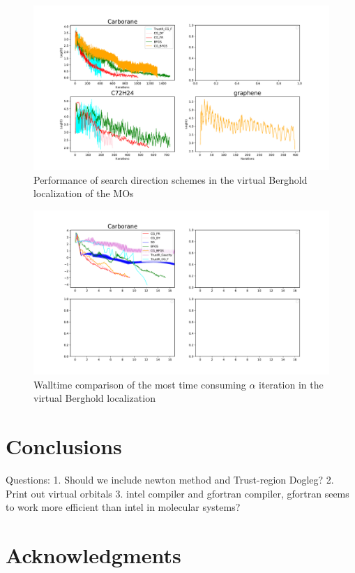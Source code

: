 \documentclass[aps,prl,reprint,amsmath,amssymb]{revtex4-1}
\begin{document}
\begin{figure}[htb]
\centering
\includegraphics[width=\textwidth]{virtual_grad.pdf}
\caption{Performance of search direction schemes in the virtual Berghold localization of the MOs}
\label{fig:vir_grad}
\end{figure}


\begin{figure}[htb]
\centering
\includegraphics[width=\textwidth]{virtual_walltime.pdf}
\caption{Walltime comparison of the most time consuming $\alpha$ iteration in the virtual Berghold localization}
\label{fig:vir_walltime}
\end{figure}


\section{Conclusions}

Questions:
1. Should we include newton method and Trust-region Dogleg?
2. Print out virtual orbitals
3. intel compiler and gfortran compiler, gfortran seems to work more efficient than intel in molecular systems?


\section{Acknowledgments} 


%

\end{document}
